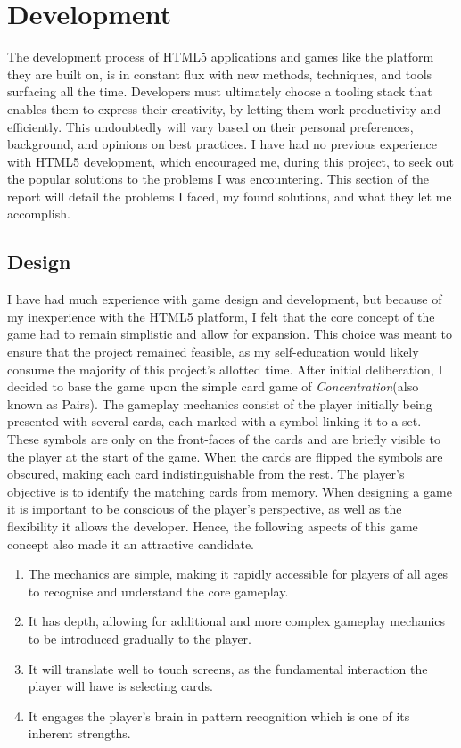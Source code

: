 \documentclass[final]{cmpreport}
\begin{document}
\section{Development}
\label{sec:dev}
The development process of HTML5 applications and games like the platform they are built on, is in constant flux with new methods, techniques, and tools surfacing all the time. Developers must ultimately choose a tooling stack that enables them to express their creativity, by letting them work productivity and efficiently. This undoubtedly will vary based on their personal preferences, background, and opinions on best practices. I have had no previous experience with HTML5 development, which encouraged me, during this project, to seek out the popular solutions to the problems I was encountering. This section of the report will detail the problems I faced, my found solutions, and what they let me accomplish. 

\subsection{Design}
I have had much experience with game design and development, but because of my inexperience with the HTML5 platform, I felt that the core concept of the game had to remain simplistic and allow for expansion. This choice was meant to ensure that the project remained feasible, as my self-education would likely consume the majority of this project's allotted time. After initial deliberation, I decided to base the game upon the simple card game of \textit{Concentration}\footnotemark[26] (also known as Pairs). The gameplay mechanics consist of the player initially being presented with several cards, each marked with a symbol linking it to a set. These symbols are only on the front-faces of the cards and are briefly visible to the player at the start of the game. When the cards are flipped the symbols are obscured, making each card indistinguishable from the rest. The player's objective is to identify the matching cards from memory. When designing a game it is important to be conscious of the player's perspective, as well as the flexibility it allows the developer. Hence, the following aspects of this game concept also made it an attractive candidate.


\begin{enumerate}
  \item The mechanics are simple, making it rapidly accessible for players of all ages to recognise and understand the core gameplay.
  \item It has depth, allowing for additional and more complex gameplay mechanics to be introduced gradually to the player.
  \item It will translate well to touch screens, as the fundamental interaction the player will have is selecting cards.
  \item It engages the player's brain in pattern recognition which is one of its inherent strengths.
\end{enumerate}
\end{document}
